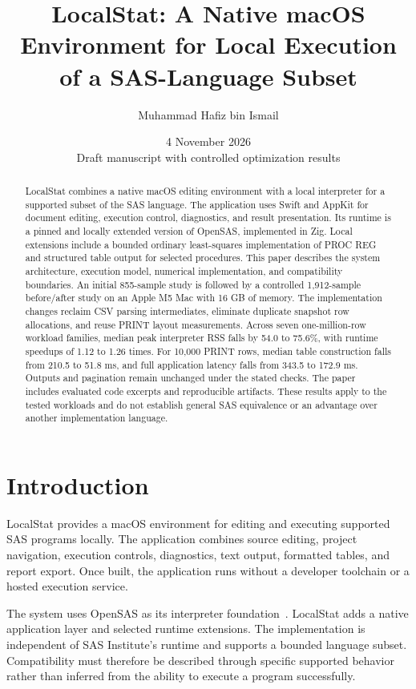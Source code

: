 \documentclass[11pt,a4paper]{article}
\title{LocalStat: A Native macOS Environment for Local
Execution of a SAS-Language Subset}
\author{Muhammad Hafiz bin Ismail}
\date{4 November 2026\\Draft manuscript with controlled optimization results}
\begin{document}
\maketitle

\begin{abstract}
LocalStat combines a native macOS editing environment with a
local interpreter for a supported subset of the SAS language.
The application uses Swift and AppKit for document editing,
execution control, diagnostics, and result presentation. Its
runtime is a pinned and locally extended version of OpenSAS,
implemented in Zig. Local extensions include a bounded ordinary
least-squares implementation of PROC REG and structured table
output for selected procedures. This paper describes the system
architecture, execution model, numerical implementation, and
compatibility boundaries. An initial 855-sample study is followed
by a controlled 1,912-sample before/after study on an Apple M5
Mac with 16 GB of memory. The implementation changes reclaim
CSV parsing intermediates, eliminate duplicate snapshot row
allocations, and reuse PRINT layout measurements. Across seven
one-million-row workload families, median peak interpreter RSS
falls by 54.0 to 75.6\%, with runtime speedups of
1.12 to 1.26 times. For 10,000 PRINT rows, median table construction
falls from 210.5 to 51.8 ms, and full application latency falls
from 343.5 to 172.9 ms. Outputs and pagination remain unchanged
under the stated checks. The paper includes evaluated code
excerpts and reproducible artifacts. These results apply to the
tested workloads and do not establish general SAS equivalence
or an advantage over another implementation language.
\end{abstract}

\section{Introduction}

LocalStat provides a macOS environment for editing and executing
supported SAS programs locally. The application combines source
editing, project navigation, execution controls, diagnostics,
text output, formatted tables, and report export. Once built,
the application runs without a developer toolchain or a hosted
execution service.

The system uses OpenSAS as its interpreter foundation~\cite{opensas}.
LocalStat adds a native application layer and
selected runtime extensions. The implementation is independent
of SAS Institute's runtime and supports a bounded language
subset. Compatibility must therefore be described through
specific supported behavior rather than inferred from the
ability to execute a program successfully.
\end{document}
